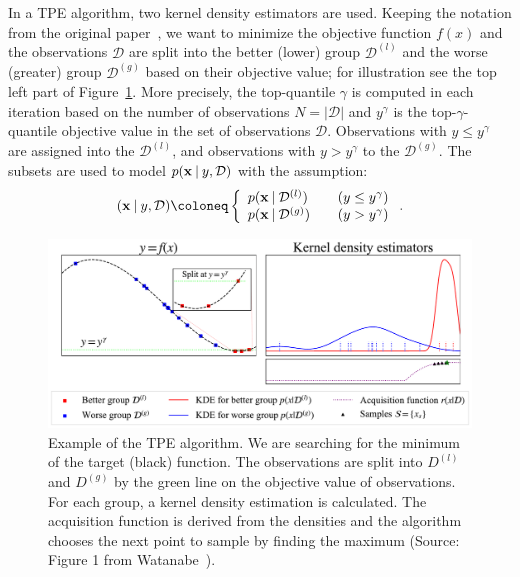In a TPE algorithm, two kernel density estimators are used. Keeping the notation from the original paper~\cite{bergstra2011algorithms}, we want to minimize the objective function $f(x)$ and the observations $\mathcal{D}$ are split into the better (lower) group $\mathcal{D}^{(l)}$ and the worse (greater) group $\mathcal{D}^{(g)}$ based on their objective value; for illustration see the top left part of Figure~\ref{fig:tpe}. More precisely, the top-quantile $\gamma$ is computed in each iteration based on the number of observations $N=|\mathcal{D}|$ and $y^{\gamma}$ is the top-$\gamma$-quantile objective value in the set of observations $\mathcal{D}$. Observations with $y\leq y^\gamma$ are assigned into the $\mathcal{D}^{(l)}$, and observations with $y > y^\gamma$ to the $\mathcal{D}^{(g)}$. The subsets are used to model $p(\mathbf{x} \:\vert\: y, \mathcal{D})$ with the assumption:
\begin{equation} (\mathbf{x} \given y, \mathcal{D})\coloneq  \left\{
  \begin{array}{ll}
        p(\mathbf{x} \given \mathcal{D}^{(l)}) \quad  &(y \leq y^\gamma) \\
        p(\mathbf{x} \given \mathcal{D}^{(g)}) \quad  &(y > y^\gamma)
  \end{array}
  \right. .
  \label{eqn:tpe:assumption}
\end{equation}

\begin{figure}
    \centering
    \includegraphics[scale=0.40]{img/tpe-conceptual.pdf}
    \caption{Example of the TPE algorithm. We are searching for the minimum of the target (black) function. The observations are split into $D^{(l)}$ and $D^{(g)}$ by the green line on the objective value of observations. For each group, a kernel density estimation is calculated. The acquisition function is derived from the densities and the algorithm chooses the next point to sample by finding the maximum (Source: Figure 1 from Watanabe~\cite{watanabe2023tree}).}
    \label{fig:tpe}
\end{figure}


